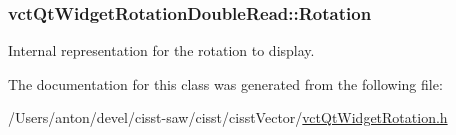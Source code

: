 \subsubsection[{Rotation}]{ vct\+Qt\+Widget\+Rotation\+Double\+Read\+::\+Rotation\hspace{0.3cm}{\ttfamily [protected]}}\label{classvct_qt_widget_rotation_double_read_ab356235edf17d23d15ce8289b4ad91c9}
Internal representation for the rotation to display. 

The documentation for this class was generated from the following file\+:\begin{DoxyCompactItemize}
\item 
/\+Users/anton/devel/cisst-\/saw/cisst/cisst\+Vector/\hyperlink{vct_qt_widget_rotation_8h}{vct\+Qt\+Widget\+Rotation.\+h}\end{DoxyCompactItemize}
